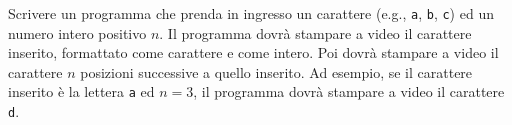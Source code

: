 \begin{Exercise}[label={ex:caratteri}]
  Scrivere un programma che prenda in ingresso un carattere (e.g., \texttt{a}, \texttt{b}, \texttt{c}) ed un numero intero positivo $n$. Il programma dovrà stampare a video il carattere inserito, formattato come carattere e come intero. Poi dovrà stampare a video il carattere $n$ posizioni successive a quello inserito. Ad esempio, se il carattere inserito è la lettera \texttt{a} ed $n = 3$, il programma dovrà stampare a video il carattere \texttt{d}.
\end{Exercise}

\begin{Answer}[ref={ex:caratteri}]
  
\end{Answer}